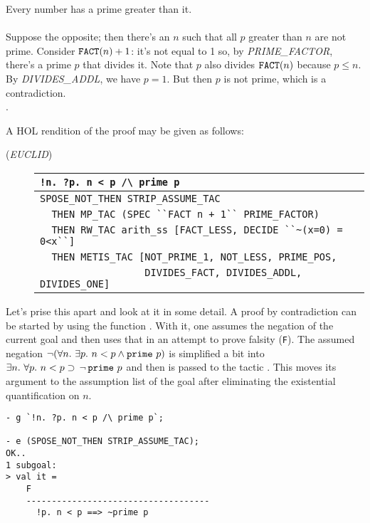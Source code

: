  Every number has a prime greater than it.\\
 \\
\noindent Suppose the opposite; then there's an $n$
such that all $p$ greater than $n$ are not prime. Consider $\mbox{\tt
FACT}(n) + 1$: it's not equal to 1 so, by {\small{\it PRIME\_FACTOR}},
there's a prime $p$ that divides it. Note that $p$ also divides
$\mbox{\tt FACT}(n)$ because $p \leq n$. By {\small{\it DIVIDES\_ADDL}},
we have $p=1$. But then $p$ is not prime, which is a contradiction. \\
.

A HOL rendition of the proof may be given as follows:
\begin{description}
\item [\small{({\it EUCLID\/})}]
\begin{tabular}[t]{l}
\verb+!n. ?p. n < p /\ prime p+ \\ \hline
\verb+SPOSE_NOT_THEN STRIP_ASSUME_TAC+ \\
\verb!  THEN MP_TAC (SPEC ``FACT n + 1`` PRIME_FACTOR)! \\
\verb+  THEN RW_TAC arith_ss [FACT_LESS, DECIDE ``~(x=0) = 0<x``]+ \\
\verb+  THEN METIS_TAC [NOT_PRIME_1, NOT_LESS, PRIME_POS, + \\
\verb+                  DIVIDES_FACT, DIVIDES_ADDL, DIVIDES_ONE]+ \\
\end{tabular}
\end{description}
Let's prise this apart and look at it in some detail. A proof by
contradiction can be started by using the  function
. With it, one assumes the negation of the
current goal and then uses that in an attempt to prove falsity
(\verb+F+). The assumed negation $\neg(\forall n.\ \exists p.\ n < p
\land \mbox{\tt prime}\ p)$ is simplified a bit into $\exists n.\
\forall p.\ n < p \supset \, \neg \,\mbox{\tt prime}\ p$ and then is
passed to the tactic \ml{STRIP\_ASSUME\_TAC}. This moves its argument
to the assumption list of the goal after eliminating the existential
quantification on $n$.
\begin{session}
\begin{verbatim}
- g `!n. ?p. n < p /\ prime p`;

- e (SPOSE_NOT_THEN STRIP_ASSUME_TAC);
OK..
1 subgoal:
> val it =
    F
    ------------------------------------
      !p. n < p ==> ~prime p
\end{verbatim}
\end{session}
